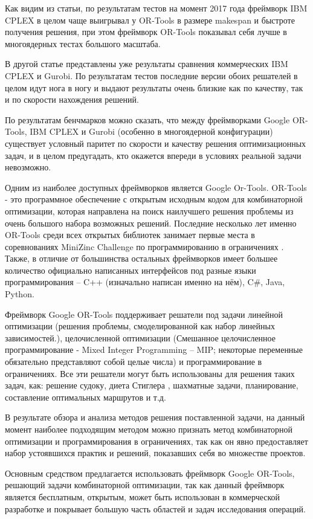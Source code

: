 Как видим из статьи, по результатам тестов на момент 2017 года фреймворк IBM CPLEX в целом чаще выигрывал у OR-Tools в размере makespan и быстроте получения решения, при этом фреймворк OR-Tools показывал себя лучше в многоядерных тестах большого масштаба.

В другой статье \cite{mipshit} представлены уже результаты сравнения коммерческих IBM CPLEX и Gurobi. По результатам тестов последние версии обоих решателей в целом идут нога в ногу и выдают результаты очень близкие как по качеству, так и по скорости нахождения решений.

По результатам бенчмарков можно сказать, что между фреймворками Google OR-Tools, IBM CPLEX и Gurobi (особенно в многоядерной конфигурации) существует условный паритет по скорости и качеству решения оптимизационных задач, и в целом предугадать, кто окажется впереди в условиях реальной задачи невозможно.

Одним из наиболее доступных фреймворков является Google Or-Tools. OR-Tools - это программное обеспечение с открытым исходным кодом для комбинаторной оптимизации, которая направлена на поиск наилучшего решения проблемы из очень большого набора возможных решений. Последние несколько лет именно OR-Tools среди всех открытых библиотек занимает первые места в соревнованиях MiniZinc Challenge по программированию в ограничениях \cite{zincchal}. Также, в отличие от большинства остальных фреймворков имеет большее количество официально написанных интерфейсов под разные языки программирования – C++ (изначально написан именно на нём), C\#, Java, Python.

Фреймворк Google OR-Tools поддерживает решатели под задачи линейной оптимизации (решения проблемы, смоделированной как набор линейных зависимостей.), целочисленной оптимизации (Смешанное целочисленное программирование - Mixed Integer Programming – MIP; некоторые переменные обязательно представляют собой целые числа) и программирование в ограничениях. Все эти решатели могут быть использованы для решения таких задач, как: решение судоку, диета Стиглера \cite{stigler}, шахматные задачи, планирование, составление оптимальных маршрутов и т.д.

В результате обзора и анализа методов решения поставленной задачи, на данный момент наиболее подходящим методом можно признать метод комбинаторной оптимизации и программирования в ограничениях, так как он явно предоставляет набор устоявшихся практик и решений, показавших себя во множестве проектов.

Основным средством предлагается использовать фреймворк Google OR-Tools, решающий задачи комбинаторной оптимизации, так как данный фреймворк является бесплатным, открытым, может быть использован в коммерческой разработке и покрывает большую часть областей и задач исследования операций.

